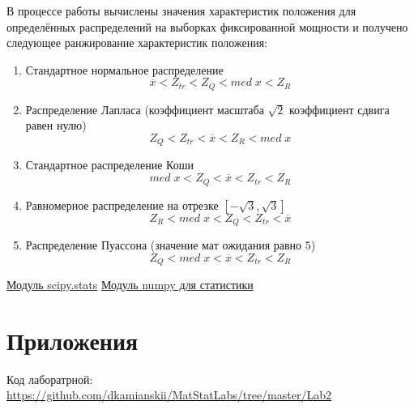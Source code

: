 \documentclass[a4]{article}
\begin{document}
\par В процессе работы вычислены значения характеристик положения для определённых распределений на выборках фиксированной мощности и получено следующее ранжирование характеристик положения:

\begin{enumerate}
    \item Стандартное нормальное распределение $$\overline{x} < Z_{tr} < Z_Q < med\;x < Z_R$$
    
    \item Распределение Лапласа (коэффициент масштаба $\sqrt{2}$ коэффициент сдвига равен нулю) $$Z_Q < Z_{tr} < \overline{x} <  Z_R <med\;x$$
    
    \item Стандартное распределение Коши $$med\;x < Z_Q <  \overline{x} < Z_{tr} < Z_R$$
    
    \item Равномерное распределение на отрезке $\left[-\sqrt{3},\sqrt{3}\right]$ $$Z_R < med\;x < Z_Q < Z_{tr} < \overline{x}$$
    
    \item Распределение Пуассона (значение мат ожидания равно $5$) $$Z_Q < med\;x < \overline{x} < Z_{tr} < Z_R$$
    
\end{enumerate}



\begin{thebibliography}{}
    \href{https://docs.scipy.org/doc/scipy/reference/stats.html}{Модуль scipy.stats}
    \href{https://docs.scipy.org/doc/numpy/reference/routines.statistics.html}{Модуль numpy для статистики}
\end{thebibliography}

\section{Приложения}


Код лаборатрной:\; \url{https://github.com/dkamianskii/MatStatLabs/tree/master/Lab2}

%
\end{document}
